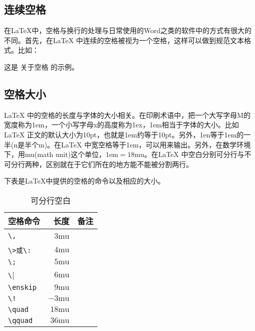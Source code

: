 \subsection{连续空格}
在\LaTeX 中，空格与换行的处理与日常使用的Word之类的软件中的方式有很大的不同。首先，在\LaTeX
中连续的空格被视为一个空格，这样可以做到规范文本格式。比如：
\begin{texlst}
	这是 关于空格    的示例。
\end{texlst}

\subsection{空格大小}
\LaTeX
中的空格的长度与字体的大小相关。在印刷术语中，把一个大写字母M的宽度称为1em，一个小写字母x的高度称为1ex，1em相当于字体的大小。比如\LaTeX
正文的默认大小为10pt，也就是1em约等于10pt。另外，1en等于1em的一半(n是半个m)。在\LaTeX
中宽空格等于1em，可以用\texinline{\quad}来输出。另外，在数学环境下，用mu(math unit)这个单位，$1\text{em}=18\text{mu}$。在\LaTeX
中空白分别可分行与不可分行两种，区别就在于它们所在的地方能不能被分割两行。

下表是\LaTeX 中提供的空格的命令以及相应的大小。

\begin{table}[htpb]
	\centering
	\begin{tabular}{lrl} \toprule
		空格命令                  & 长度          & 备注                          \\ \midrule
		\verb|\,|                 & $3\text{mu}$  & \Rightarrow\,\Leftarrow       \\
		\verb|\>或\:|             & $4\text{mu}$  & \Rightarrow\>\Leftarrow       \\
		\verb|\;|                 & $5\text{mu}$  & \Rightarrow\;\Leftarrow       \\
		\verb|\|\textvisiblespace & $6\text{mu}$  & \Rightarrow\ \Leftarrow       \\
		\verb|\enskip|            & $9\text{mu}$  & \Rightarrow\enskip \Leftarrow \\
		\verb|\!|                 & $-3\text{mu}$ & \Rightarrow\!\Leftarrow       \\
		\verb|\quad|              & $18\text{mu}$ & \Rightarrow\quad \Leftarrow   \\
		\verb|\qquad|             & $36\text{mu}$ & \Rightarrow\qquad \Leftarrow  \\ \bottomrule
	\end{tabular}
	\caption{可分行空白}
\end{table}

